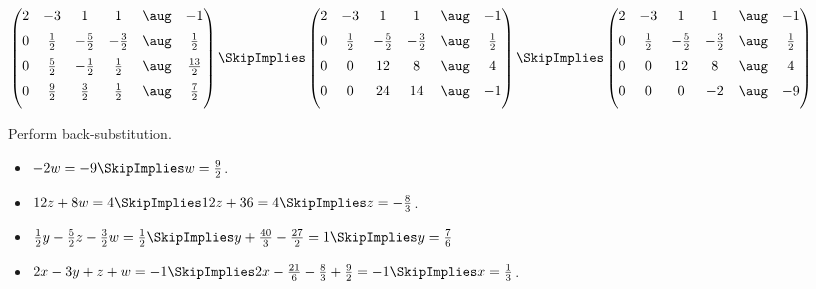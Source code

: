 \documentclass[oneside,12pt]{amsart}
\begin{document}
$
\begin{pmatrix}
  2  & -3           &  1           &  1           & \aug & -1            \\[6pt]
  0  & \frac{1}{2}  & -\frac{5}{2} & -\frac{3}{2} & \aug &  \frac{1}{2}  \\[6pt]
  0  & \frac{5}{2}  & -\frac{1}{2} &  \frac{1}{2} & \aug &  \frac{13}{2} \\[6pt]
  0  & \frac{9}{2}  &  \frac{3}{2} &  \frac{1}{2} & \aug &  \frac{7}{2}  \\[6pt]
\end{pmatrix}
\SkipImplies
\begin{pmatrix}
  2  & -3           &  1           &  1           & \aug & -1            \\[6pt]
  0  & \frac{1}{2}  & -\frac{5}{2} & -\frac{3}{2} & \aug &  \frac{1}{2}  \\[6pt]
  0  & 0            & 12           &  8           & \aug &  4             \\[6pt]
  0  & 0            & 24           &  14          & \aug & -1  \\[6pt]
\end{pmatrix}
\SkipImplies
\begin{pmatrix}
  2  & -3           &  1           &  1           & \aug & -1            \\[6pt]
  0  & \frac{1}{2}  & -\frac{5}{2} & -\frac{3}{2} & \aug &  \frac{1}{2}  \\[6pt]
  0  & 0            & 12           &  8           & \aug &  4             \\[6pt]
  0  & 0            & 0            &  -2          & \aug & -9             \\[6pt]
\end{pmatrix}
$

\bigskip

Perform back-substitution.

\begin{itemize}
\item $-2w = -9 \SkipImplies w = \frac{9}{2}$.
\item $12z + 8w = 4 \SkipImplies 12z + 36 = 4 \SkipImplies z = -\frac{8}{3}$.
\item $\frac{1}{2}y -\frac{5}{2}z -\frac{3}{2}w = \frac{1}{2} \SkipImplies y +\frac{40}{3} -\frac{27}{2} = 1 \SkipImplies y = \frac{7}{6}$
\item $2x - 3y + z + w = -1 \SkipImplies 2x -\frac{21}{6} -\frac{8}{3} + \frac{9}{2} = -1 \SkipImplies x =  \frac{1}{3}$.
\end{itemize}
\end{document}
